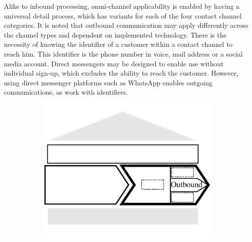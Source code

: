 		Alike to inbound processing, omni-channel applicability is enabled by having a universal detail process, which has variants for each of the four contact channel categories. It is noted that outbound communication may apply differently across the channel types and dependent on implemented technology. There is the necessity of knowing the identifier of a customer within a contact channel to reach him. This identifier is the phone number in voice, mail address or a social media account. Direct messengers may be designed to enable use without individual sign-up, which excludes the ability to reach the customer. However, using direct messenger platforms such as WhatsApp enables outgoing communications, as work with identifiers. 
		
				\begin{figure}[caption={Outbound process}, label={fig:outbound}]
			\begin{subfigure}[b]{.45\textwidth}
				\begin{center}
					\includegraphics{figures/outbound.pdf}
				\end{center}
			\end{subfigure}
			\begin{subfigure}[b]{.45\textwidth}
				\begin{center}
				\end{center}
			\end{subfigure}
			
		\end{figure}
		

